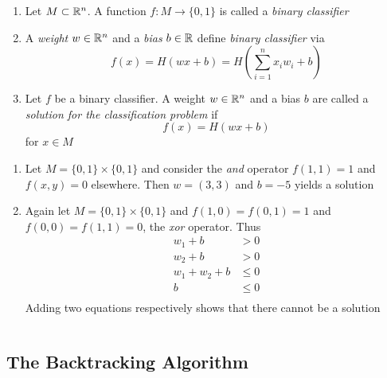 \begin{definition}\hfill
    \begin{enumerate}
		\item Let \( M \subset \mathbb{R}^n \). A function \( f: M \to \{ 0, 1 \} \) is called a \emph{binary classifier} 
		\item A \emph{weight} \( w \in \mathbb{R}^n \) and a \emph{bias} \( b \in \mathbb{R} \) define \emph{binary classifier} via
			\[
				f(x) = H(wx + b) = H(\sum_{i=1}^n x_i w_i + b)
			\]
		\item Let \( f \) be a binary classifier. A weight \( w \in \mathbb{R}^n \) and a bias \( b \) are called a
			\emph{solution for the classification problem} if 
				\[
					f(x) = H(wx + b)
				\]
			for \( x \in M \)
    \end{enumerate}
\end{definition}
\bigskip


\begin{examples}\hfill
    \begin{enumerate}
        \item Let \( M = \{ 0, 1 \} \times \{ 0, 1 \} \) and consider the \emph{and} operator 
		    \( f(1, 1) = 1 \) and \( f(x, y) = 0 \) elsewhere. Then \( w = (3, 3) \) and \( b = -5 \) 
			yields a solution
        \item Again let \( M = \{ 0, 1 \} \times \{ 0, 1 \} \) and \( f(1, 0) = f(0, 1) = 1 \) and 
			\( f(0, 0) = f(1, 1) = 0 \), the \emph{xor} operator. Thus
				\[
					\begin{split}
						w_1 + b & > 0 \\
						w_2 + b & > 0 \\
						w_1 + w_2 + b & \le 0 \\
						b & \le 0 \\
					\end{split}
				\]
			Adding two equations respectively shows that there cannot be a solution
	\end{enumerate}
\end{examples}
\bigskip


\begin{algorithm}[Perceptron]\label{algo:perceptron}
\end{algorithm}
\inputminted[fontsize=\small, framesep=0.35cm, frame=lines, python3=true]{python}{python/perceptron.py}
\bigskip


\subsection{The Backtracking Algorithm}


